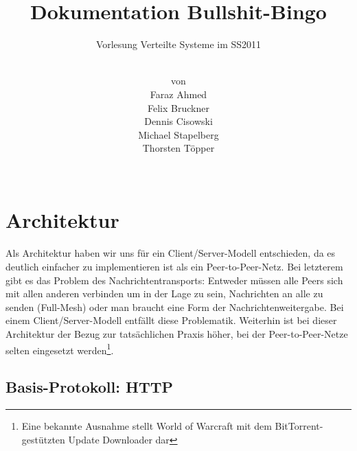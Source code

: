 \documentclass[12pt, a4paper]{scrartcl}
\begin{document}
\pagestyle{fancy}
\newcommand{\np}{\bigskip\noindent}

\setlength{\parindent}{0pt}

\lstset{%
	basicstyle=\small\ttfamily,%
	showstringspaces=false,%
	frame=single,%
}


\author{\\
von\\
Faraz Ahmed\\
Felix Bruckner\\
Dennis Cisowski\\
Michael Stapelberg\\
Thorsten Töpper\\
~}
\title{Dokumentation Bullshit-Bingo}
\subtitle{Vorlesung Verteilte Systeme im SS2011}

\maketitle
\clearpage

\tableofcontents

\clearpage
\section{Architektur}

Als Architektur haben wir uns für ein Client/Server-Modell entschieden, da es
deutlich einfacher zu implementieren ist als ein Peer-to-Peer-Netz. Bei
letzterem gibt es das Problem des Nachrichtentransports: Entweder müssen alle
Peers sich mit allen anderen verbinden um in der Lage zu sein, Nachrichten an
alle zu senden (Full-Mesh) oder man braucht eine Form der
Nachrichtenweitergabe. Bei einem Client/Server-Modell entfällt diese
Problematik. Weiterhin ist bei dieser Architektur der Bezug zur tatsächlichen
Praxis höher, bei der Peer-to-Peer-Netze selten eingesetzt werden\footnote{Eine
bekannte Ausnahme stellt World of Warcraft mit dem BitTorrent-gestützten Update
Downloader dar}.

\subsection{Basis-Protokoll: HTTP}
\end{document}

